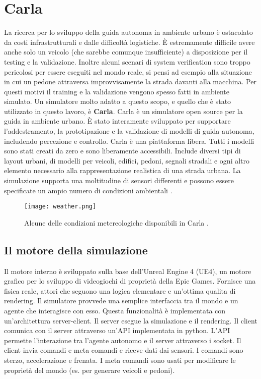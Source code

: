 \section{Carla}
La ricerca per lo sviluppo della guida autonoma in ambiente urbano è  ostacolato da costi infrastrutturali e dalle difficoltà logistiche. È
estremamente difficile avere anche solo un veicolo (che sarebbe comunque insufficiente) a disposizione per il testing e la validazione. Inoltre
alcuni scenari di system verification sono troppo pericolosi per essere eseguiti nel mondo reale, si pensi ad esempio alla situazione in cui
un pedone attraversa improvvisamente la strada davanti alla macchina. Per questi motivi il training e la validazione vengono spesso fatti in ambiente simulato.  Un simulatore molto adatto a questo scopo, e quello che è stato utilizzato in questo lavoro,
è \textbf{Carla}. Carla è un simulatore open source per la guida in ambiente urbano. È stato interamente sviluppato per supportare l'addestramento, la prototipazione
e la validazione di modelli di guida autonoma, includendo percezione e controllo. Carla è una piattaforma libera. Tutti i modelli sono stati creati da zero
e sono liberamente accessibili. Include diversi tipi di layout urbani, di modelli per veicoli, edifici, pedoni, segnali stradali e ogni altro elemento necessario
alla rappresentazione realistica di una strada urbana.
La simulazione supporta una moltitudine di sensori differenti e possono essere specificate un ampio numero di condizioni ambientali \cite{carla}.
\begin{figure}[h]
    \texttt{[image: weather.png]}
    \caption{Alcune delle condizioni metereologiche disponibili in Carla \cite{carla}.}
    \label{fig:weath}
\end{figure}

\subsection{Il motore della simulazione}
Il motore interno è sviluppato sulla base dell'Unreal Engine 4 (UE4), un motore grafico per lo sviluppo di videogiochi di proprietà della Epic Games. Fornisce una fisica reale, attori che seguono una logica elementare e un'ottima qualita di rendering.
Il simulatore provvede una semplice interfaccia tra il mondo e un agente che interagisce con esso. Questa funzionalità è implementata con un'architettura server-client.
Il server esegue la simulazione e il rendering. Il client comunica con il server attraverso un'API implementata in python. L'API permette l'interazione tra l'agente autonomo e il server
attraverso i socket. Il client invia comandi e meta comandi e riceve dati dai sensori. I comandi sono sterzo, accelerazione e frenata. I meta comandi sono usati per modificare le proprietà
del mondo (es. per generare veicoli e pedoni).
